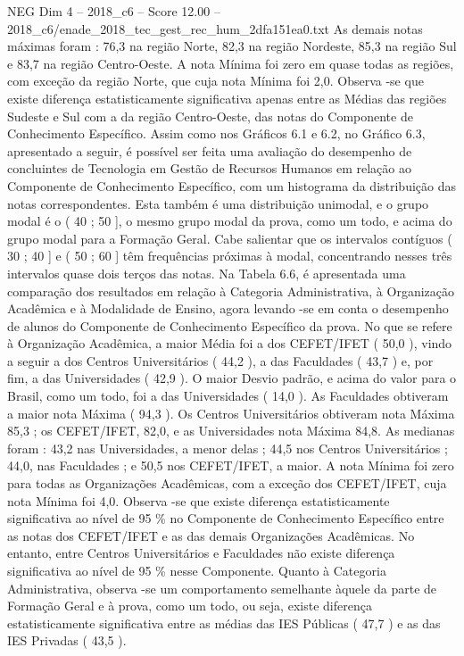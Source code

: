 \begin{textsample}{NEG Dim 4 – 2018\_c6 – Score 12.00 – 2018\_c6/enade\_2018\_tec\_gest\_rec\_hum\_2dfa151ea0.txt}
As demais notas máximas foram : 76,3 na região Norte, 82,3 na região Nordeste, 85,3 na região Sul e 83,7 na região Centro-Oeste.
A nota Mínima foi zero em quase todas as regiões, com exceção da região Norte, que cuja nota Mínima foi 2,0.
Observa -se que existe diferença estatisticamente significativa apenas entre as Médias das regiões Sudeste e Sul com a da região Centro-Oeste, das notas do Componente de Conhecimento Específico.
Assim como nos Gráficos 6.1 e 6.2, no Gráfico 6.3, apresentado a seguir, é possível ser feita uma avaliação do desempenho de concluintes de Tecnologia em Gestão de Recursos Humanos em relação ao Componente de Conhecimento Específico, com um histograma da distribuição das notas correspondentes.
Esta também é uma distribuição unimodal, e o grupo modal é o ( 40 ; 50 ], o mesmo grupo modal da prova, como um todo, e acima do grupo modal para a Formação Geral.
Cabe salientar que os intervalos contíguos ( 30 ; 40 ] e ( 50 ; 60 ] têm frequências próximas à modal, concentrando nesses três intervalos quase dois terços das notas.
Na Tabela 6.6, é apresentada uma comparação dos resultados em relação à Categoria Administrativa, à Organização Acadêmica e à Modalidade de Ensino, agora levando -se em conta o desempenho de alunos do Componente de Conhecimento Específico da prova.
No que se refere à Organização Acadêmica, a maior Média foi a dos CEFET/IFET ( 50,0 ), vindo a seguir a dos Centros Universitários ( 44,2 ), a das Faculdades ( 43,7 ) e, por fim, a das Universidades ( 42,9 ).
O maior Desvio padrão, e acima do valor para o Brasil, como um todo, foi a das Universidades ( 14,0 ).
As Faculdades obtiveram a maior nota Máxima ( 94,3 ).
Os Centros Universitários obtiveram nota Máxima 85,3 ; os CEFET/IFET, 82,0, e as Universidades nota Máxima 84,8.
As medianas foram : 43,2 nas Universidades, a menor delas ; 44,5 nos Centros Universitários ; 44,0, nas Faculdades ; e 50,5 nos CEFET/IFET, a maior.
A nota Mínima foi zero para todas as Organizações Acadêmicas, com a exceção dos CEFET/IFET, cuja nota Mínima foi 4,0.
Observa -se que existe diferença estatisticamente significativa ao nível de 95 \% no Componente de Conhecimento Específico entre as notas dos CEFET/IFET e as das demais Organizações Acadêmicas.
No entanto, entre Centros Universitários e Faculdades não existe diferença significativa ao nível de 95 \% nesse Componente.
Quanto à Categoria Administrativa, observa -se um comportamento semelhante àquele da parte de Formação Geral e à prova, como um todo, ou seja, existe diferença estatisticamente significativa entre as médias das IES Públicas ( 47,7 ) e as das IES Privadas ( 43,5 ).

\end{textsample}
